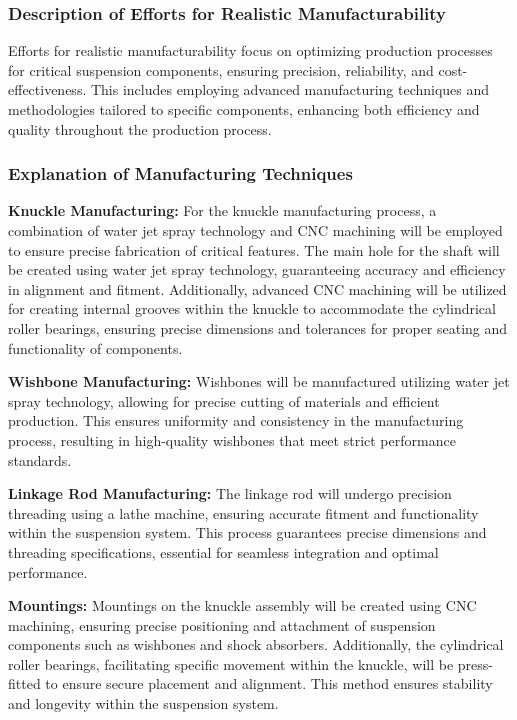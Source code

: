 \subsubsection{Description of Efforts for Realistic Manufacturability}

Efforts for realistic manufacturability focus on optimizing production processes for critical suspension components, ensuring precision, reliability, and cost-effectiveness. This includes employing advanced manufacturing techniques and methodologies tailored to specific components, enhancing both efficiency and quality throughout the production process.

\subsubsection{Explanation of Manufacturing Techniques}


\textbf{Knuckle Manufacturing:} For the knuckle manufacturing process, a combination of water jet spray technology and CNC machining will be employed to ensure precise fabrication of critical features. The main hole for the shaft will be created using water jet spray technology, guaranteeing accuracy and efficiency in alignment and fitment. Additionally, advanced CNC machining will be utilized for creating internal grooves within the knuckle to accommodate the cylindrical roller bearings, ensuring precise dimensions and tolerances for proper seating and functionality of components.

\textbf{Wishbone Manufacturing:} Wishbones will be manufactured utilizing water jet spray technology, allowing for precise cutting of materials and efficient production. This ensures uniformity and consistency in the manufacturing process, resulting in high-quality wishbones that meet strict performance standards.

\textbf{Linkage Rod Manufacturing:} The linkage rod will undergo precision threading using a lathe machine, ensuring accurate fitment and functionality within the suspension system. This process guarantees precise dimensions and threading specifications, essential for seamless integration and optimal performance.

\textbf{Mountings:} Mountings on the knuckle assembly will be created using CNC machining, ensuring precise positioning and attachment of suspension components such as wishbones and shock absorbers. Additionally, the cylindrical roller bearings, facilitating specific movement within the knuckle, will be press-fitted to ensure secure placement and alignment. This method ensures stability and longevity within the suspension system.

